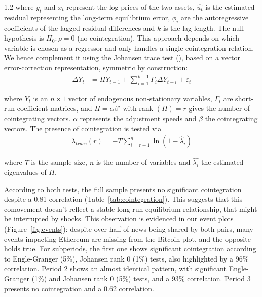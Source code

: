 \documentclass[10pt]{article}
\begin{document}
\begin{setstretch}{1.2}
\noindent where $y_t$ and $x_t$ represent the log-prices of the two assets, $\hat{u_t}$ is the estimated residual representing the long-term equilibrium error, $\phi_i$ are the autoregressive coefficients of the lagged residual differences and $k$ is the lag length. The null hypothesis is  $H_0:\rho=0$ (no cointegration). This approach depends on which variable is chosen as a regressor and only handles a single cointegration relation. We hence complement it using the Johansen trace test (\cite{Johansen1988}), based on a vector error-correction representation, symmetric by construction:
\begin{align}
\Delta Y_t &= \Pi Y_{t-1} + \sum_{i=1}^{k-1}\Gamma_i \Delta Y_{t-i} + \varepsilon_t \tag{11}
\end{align}

\noindent where $Y_t$ is an $n\times 1$ vector of endogenous non-stationary variables, $\Gamma_i$ are short-run coefficient matrices, and  $\Pi=\alpha\beta '$ with rank $(\Pi)=r$ gives the number of cointegrating vectors. $\alpha$ represents the adjustment speeds and $\beta$ the cointegrating vectors. The presence of cointegration is tested via
\begin{align}
\lambda_{trace}(r) = -T\sum_{i=r+1}^{n}\ln(1-\hat\lambda_i) \tag{12}
\end{align}

\noindent where $T$ is the sample size, $n$ is the number of variables and $\hat{\lambda_i}$ the estimated eigenvalues of $\Pi$. 

According to both tests, the full sample presents no significant cointegration despite a 0.81 correlation (Table~\ref{tab:cointegration}). This suggests that this comovement doesn't reflect a stable long-run equilibrium relationship, that might be interrupted by shocks. This observation is evidenced in our event plots (Figure~\ref{fig:events}): despite over half of news being shared by both pairs, many events impacting Ethereum are missing from the Bitcoin plot, and the opposite holds true. For subperiods, the first one shows significant cointegration according to Engle-Granger (5\%), Johansen rank 0 (1\%) tests, also highlighted by a 96\% correlation. Period 2 shows an almost identical pattern, with significant Engle-Granger (1\%) and Johansen rank 0 (5\%) tests, and a 93\% correlation. Period 3 presents no cointegration and a 0.62 correlation.


\end{setstretch}
\end{document}
